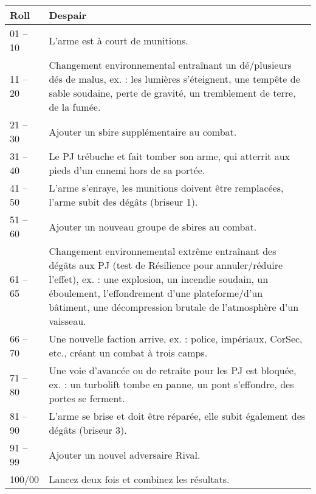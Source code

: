 \documentclass{article}
\begin{document}
\title{\vspace{-0.5cm}{\Huge Désastres} \vspace{-1cm}}

\date{}

\maketitle

\renewcommand{\arraystretch}{1.4}

\begin{center}
	\begin{tabular}{|p{1.5cm}|p{15cm}|}
		\hline 
		\cellcolor{DarkRed} {\large \textcolor{PureWhite}{\textbf{Roll}}} & \cellcolor{DarkRed} {\large \textcolor{PureWhite}{\textbf{Despair}}} \\
		\hline 
		01 -- 10 & L’arme est à court de munitions. \\
		\hline
		11 -- 20 & Changement environnemental entraînant un dé/plusieurs dés de malus, ex. : les lumières s’éteignent, une tempête de sable soudaine, perte de gravité, un tremblement de terre, de la fumée. \\
		\hline
		21 -- 30 & Ajouter un sbire supplémentaire au combat. \\
		\hline
		31 -- 40 & Le PJ trébuche et fait tomber son arme, qui atterrit aux pieds d’un ennemi hors de sa portée. \\
		\hline
		41 -- 50 & L’arme s’enraye, les munitions doivent être remplacées, l’arme subit des dégâts (briseur 1). \\
		\hline
		51 -- 60 & Ajouter un nouveau groupe de sbires au combat. \\
		\hline
		61 -- 65 & Changement environnemental extrême entraînant des dégâts aux PJ (test de Résilience pour annuler/réduire l’effet), ex. : une explosion, un incendie soudain, un éboulement, l’effondrement d’une plateforme/d’un bâtiment, une décompression brutale de l’atmosphère d’un vaisseau. \\
		\hline
		66 -- 70 & Une nouvelle faction arrive, ex. : police, impériaux, CorSec, etc., créant un combat à trois camps. \\
		\hline
		71 -- 80 & Une voie d’avancée ou de retraite pour les PJ est bloquée, ex. : un turbolift tombe en panne, un pont s’effondre, des portes se ferment. \\
		\hline
		81 -- 90 & L’arme se brise et doit être réparée, elle subit également des dégâts (briseur 3). \\
		\hline
		91 -- 99 & Ajouter un nouvel adversaire Rival. \\
		\hline
		100/00 & Lancez deux fois et combinez les résultats. \\
		\hline
	\end{tabular}
\end{center}
\end{document}
